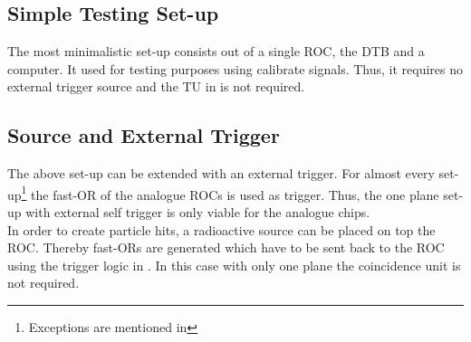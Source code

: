 \documentclass[british,11pt,a4paper]{memoir}
\begin{document}
\subsection{Simple Testing Set-up}
The most minimalistic set-up consists out of a single \ac{ROC}, the \ac{DTB} and a computer. It used for testing purposes using calibrate signals. Thus, it requires no external trigger source and the \ac{TU} in  is not required.
\subsection{Source and External Trigger}
The above set-up can be extended with an external trigger. For almost every set-up\footnote{Exceptions are mentioned in } the fast-OR of the analogue \ac{ROC}s is used as trigger. Thus, the one plane set-up with external self trigger is only viable for the analogue chips.\\
In order to create particle hits, a radioactive  source can be placed on top the \ac{ROC}. Thereby fast-ORs are generated which have to be sent back to the \ac{ROC} using the trigger logic in . In this case with only one plane the coincidence unit is not required.
\end{document}
